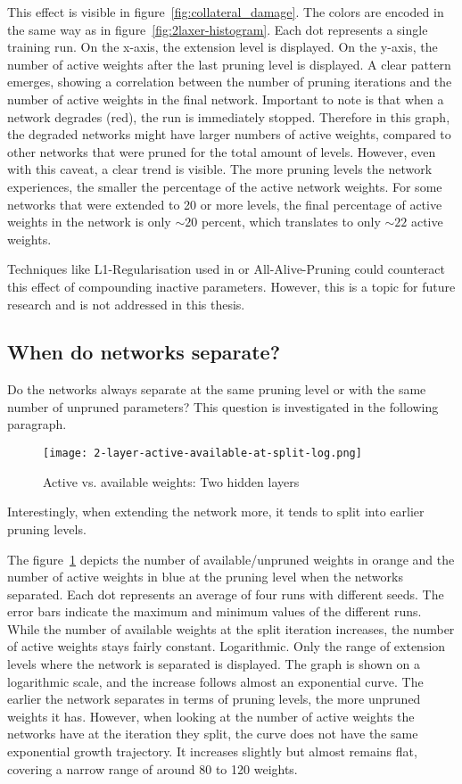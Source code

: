 This effect is visible in figure~\ref{fig:collateral_damage}.
The colors are encoded in the same way as in figure~\ref{fig:2laxer-histogram}.
Each dot represents a single training run. 
On the x-axis, the extension level is displayed.
On the y-axis, the number of active weights after the last pruning level is displayed.
A clear pattern emerges, showing a correlation between the number of pruning iterations and the number of active weights in the final network.
Important to note is that when a network degrades (red), the run is immediately stopped.
Therefore in this graph, the degraded networks might have larger numbers of active weights, compared to other networks that were pruned for the total amount of levels.
However, even with this caveat, a clear trend is visible.
The more pruning levels the network experiences, the smaller the percentage of the active network weights.
For some networks that were extended to 20 or more levels, the final percentage of active weights in the network is only $\sim20$ percent, which translates to only $\sim22$ active weights.

Techniques like L1-Regularisation used in \autocite{HanEtAl15} or All-Alive-Pruning \autocite{AllAlivePruning} could counteract this effect of compounding inactive parameters.
However, this is a topic for future research and is not addressed in this thesis. 

\subsection{When do networks separate?}
Do the networks always separate at the same pruning level or with the same number of unpruned parameters?
This question is investigated in the following paragraph.

\begin{figure}[ht]
    \centering
    \texttt{[image: 2-layer-active-available-at-split-log.png]}
    \caption{
        Active vs. available weights: Two hidden layers
    }\label{fig:2l-active-split}
\end{figure}

Interestingly, when extending the network more, it tends to split into earlier pruning levels.

The figure~\ref{fig:2l-active-split} depicts the number of available/unpruned weights in orange and the number of active weights in blue at the pruning level when the networks separated.
Each dot represents an average of four runs with different seeds.
The error bars indicate the maximum and minimum values of the different runs.
While the number of available weights at the split iteration increases, the number of active weights stays fairly constant.
Logarithmic.
Only the range of extension levels where the network is separated is displayed.
The graph is shown on a logarithmic scale, and the increase follows almost an exponential curve.
The earlier the network separates in terms of pruning levels, the more unpruned weights it has.
However, when looking at the number of active weights the networks have at the iteration they split, the curve does not have the same exponential growth trajectory.
It increases slightly but almost remains flat, covering a narrow range of around 80 to 120 weights.

